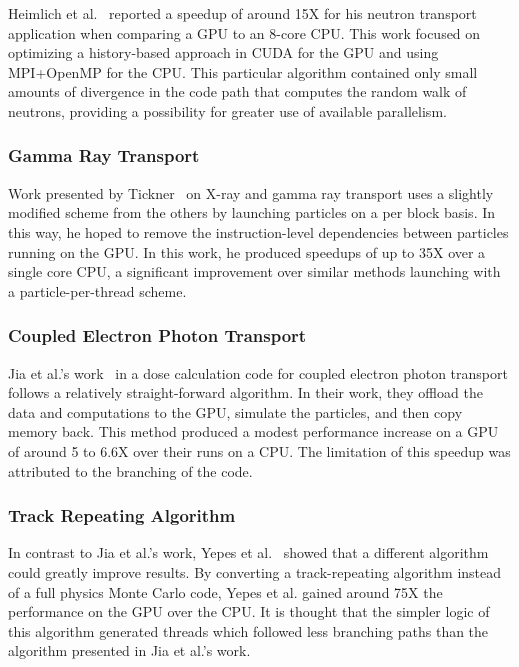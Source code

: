 Heimlich et al.~\cite{heimlich2009gpu} reported a speedup of around 15X for his neutron transport application when comparing a GPU to an 8-core CPU.
%
This work focused on optimizing a history-based approach in CUDA for the GPU and using MPI+OpenMP for the CPU.
%
This particular algorithm contained only small amounts of divergence in the code path that computes the random walk of neutrons, providing a possibility for greater use of available parallelism.
%


\subsubsection*{\textbf{Gamma Ray Transport}}
%
Work presented by Tickner~\cite{tickner2010monte} on X-ray and gamma ray transport uses a slightly modified scheme from the others by launching particles on a per block basis.
%
In this way, he hoped to remove the instruction-level dependencies between particles running on the GPU.
%
In this work, he produced speedups of up to 35X over a single core CPU, a significant improvement over similar methods launching with a particle-per-thread scheme.
%

\subsubsection*{\textbf{Coupled Electron Photon Transport}}
\label{sec:firstPassCoupledElectronPhoton}
%
Jia et al.'s  work~\cite{jia2010development} in a dose calculation code for coupled electron photon transport follows a relatively straight-forward algorithm.
%
In their work, they offload the data and computations to the GPU, simulate the particles, and then copy memory back.
%
This method produced a modest performance increase on a GPU of around 5 to 6.6X over their runs on a CPU.
%
The limitation of this speedup was attributed to the branching of the code.

\subsubsection*{\textbf{Track Repeating Algorithm}}
In contrast to Jia et al.'s work, Yepes et al.~\cite{yepes2010gpu} showed that a different algorithm could greatly improve results.
%
By converting a track-repeating algorithm instead of a full physics Monte Carlo code, Yepes et al. gained around 75X the performance on the GPU over the CPU.
%
It is thought that the simpler logic of this algorithm generated threads which followed less branching paths than the algorithm presented in Jia et al.'s work.

